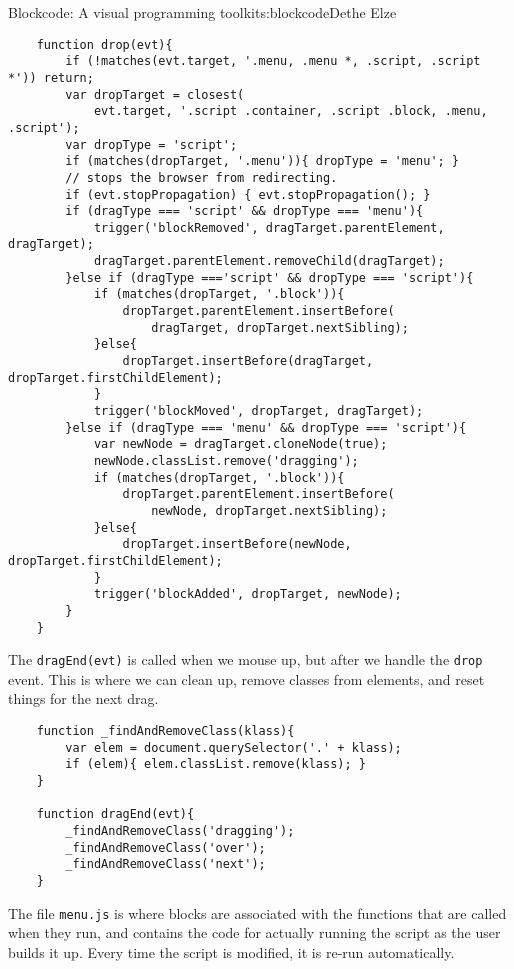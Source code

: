 \begin{aosachapter}{Blockcode: A visual programming toolkit}{s:blockcode}{Dethe Elze}
\begin{verbatim}
    function drop(evt){
        if (!matches(evt.target, '.menu, .menu *, .script, .script *')) return;
        var dropTarget = closest(
            evt.target, '.script .container, .script .block, .menu, .script');
        var dropType = 'script';
        if (matches(dropTarget, '.menu')){ dropType = 'menu'; }
        // stops the browser from redirecting.
        if (evt.stopPropagation) { evt.stopPropagation(); } 
        if (dragType === 'script' && dropType === 'menu'){
            trigger('blockRemoved', dragTarget.parentElement, dragTarget);
            dragTarget.parentElement.removeChild(dragTarget);
        }else if (dragType ==='script' && dropType === 'script'){
            if (matches(dropTarget, '.block')){
                dropTarget.parentElement.insertBefore(
                    dragTarget, dropTarget.nextSibling);
            }else{
                dropTarget.insertBefore(dragTarget, dropTarget.firstChildElement);
            }
            trigger('blockMoved', dropTarget, dragTarget);
        }else if (dragType === 'menu' && dropType === 'script'){
            var newNode = dragTarget.cloneNode(true);
            newNode.classList.remove('dragging');
            if (matches(dropTarget, '.block')){
                dropTarget.parentElement.insertBefore(
                    newNode, dropTarget.nextSibling);
            }else{
                dropTarget.insertBefore(newNode, dropTarget.firstChildElement);
            }
            trigger('blockAdded', dropTarget, newNode);
        }
    }
\end{verbatim}

The \texttt{dragEnd(evt)} is called when we mouse up, but after we
handle the \texttt{drop} event. This is where we can clean up, remove
classes from elements, and reset things for the next drag.

\begin{verbatim}
    function _findAndRemoveClass(klass){
        var elem = document.querySelector('.' + klass);
        if (elem){ elem.classList.remove(klass); }
    }

    function dragEnd(evt){
        _findAndRemoveClass('dragging');
        _findAndRemoveClass('over');
        _findAndRemoveClass('next');
    }
\end{verbatim}

\label{menu.js}

The file \texttt{menu.js} is where blocks are associated with the
functions that are called when they run, and contains the code for
actually running the script as the user builds it up. Every time the
script is modified, it is re-run automatically.


\end{aosachapter}
